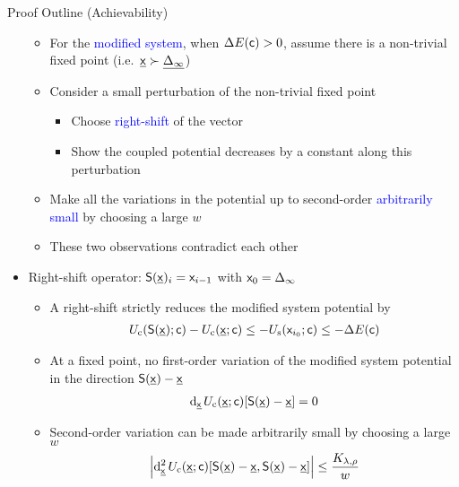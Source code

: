 \documentclass{beamer}
\newlength{\twocolwid}
\begin{document}
\begin{columns}[t]
\begin{column}{\twocolwid}
\begin{block}{Proof Outline (Achievability)}
\begin{itemize}
    \begin{itemize}
      \vspace{0.4cm}
    \item For the \textcolor{blue}{modified system}, when $\Delta E(\mathsf{c})>0$, assume there is a non-trivial fixed point (i.e.~$\underline{\mathsf{x}} \succ \underline{\Delta_{\infty}}$)
      \vspace{0.4cm}
    \item Consider a small perturbation of the non-trivial fixed point
      \begin{itemize}
      \item Choose \textcolor{blue}{right-shift} of the vector
      \item Show the coupled potential \alert{decreases by a constant} along this perturbation
      \end{itemize}
      \vspace{0.3cm}
    \item Make all the variations in the potential up to second-order \textcolor{blue}{arbitrarily small} by choosing a \alert{large $w$}
      \vspace{0.3cm}
    \item These two observations \alert{contradict} each other
    \end{itemize}
    
    \vspace{0.4cm}
  \item Right-shift operator: $\mathsf{S}(\underline{\mathsf{x}})_{i}=\mathsf{x}_{i-1}$ with $\mathsf{x}_0=\Delta_\infty$  
    \begin{itemize}
    \item A right-shift strictly reduces the modified system potential by
      \begin{align*}
        U_\mathrm{c}(\mathsf{S}(\underline{\mathsf{x}});\mathsf{c}) - U_\mathrm{c}(\underline{\mathsf{x}} ; \mathsf{c}) \leq -U_\mathrm{s}(\mathsf{x}_{i_0} ; \mathsf{c}) \leq - \Delta E(\mathsf{c})
      \end{align*}

    \item At a fixed point, no first-order variation of the modified system potential in the direction $\mathsf{S}(\underline{\mathsf{x}}) - \underline{\mathsf{x}}$
      \begin{align*}
        \mathrm{d}_{ \underline{\mathsf{x}} }\hspace{0.05cm} U_\mathrm{c}( \underline{\mathsf{x}} ; \mathsf{c})[\mathsf{S}(\underline{\mathsf{x}}) - \underline{\mathsf{x}}] = 0
      \end{align*}

    \item Second-order variation can be made arbitrarily small by choosing a large $w$
      \begin{align*}
        \left\lvert \mathrm{d}_{ \underline{\mathsf{x}} }^2\hspace{0.05cm} U_\mathrm{c}(\underline{\mathsf{x}} ; \mathsf{c})[\mathsf{S}(\underline{\mathsf{x}}) - \underline{\mathsf{x}},\mathsf{S}(\underline{\mathsf{x}}) - \underline{\mathsf{x}}] \right\rvert \leq \frac{K_{\lambda,\rho}}{w}
      \end{align*}
    \end{itemize}


\end{itemize}
\end{block}
\end{column}
\end{columns}
\end{document}

